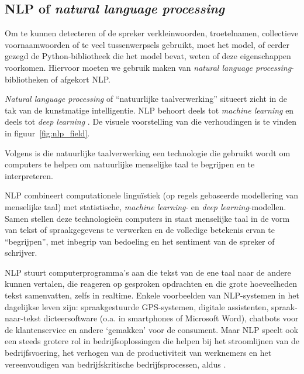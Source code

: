 {\subsection{NLP of \textit{natural language processing}}
Om te kunnen detecteren of de spreker verkleinwoorden, troetelnamen, collectieve voornaamwoorden of te veel tussenwerpsels gebruikt, moet het model, of eerder gezegd de Python-bibliotheek die het model bevat, weten of deze eigenschappen voorkomen. Hiervoor moeten we gebruik maken van \textit{natural language processing}-bibliotheken of afgekort NLP.

\textit{Natural language processing} of ``natuurlijke taalverwerking'' situeert zicht in de tak van de kunstmatige intelligentie. NLP behoort deels tot \textit{machine learning} en deels tot \textit{deep learning} \autocite{Kleinings2022}. De visuele voorstelling van die verhoudingen is te vinden in figuur~\ref{fig:nlp_field}.

Volgens \textcite{Kleinings2022} is die natuurlijke taalverwerking een technologie die gebruikt wordt om computers te helpen om natuurlijke menselijke taal te begrijpen en te interpreteren.

NLP combineert computationele linguïstiek (op regels gebaseerde modellering van menselijke taal) met statistische, \textit{machine learning}- en \textit{deep learning}-modellen. Samen stellen deze technologieën computers in staat menselijke taal in de vorm van tekst of spraakgegevens te verwerken en de volledige betekenis ervan te ``begrijpen'', met inbegrip van bedoeling en het sentiment van de spreker of schrijver.~\autocite{IBMCloudEducation2021}

NLP stuurt computerprogramma's aan die tekst van de ene taal naar de andere kunnen vertalen, die reageren op gesproken opdrachten en die grote hoeveelheden tekst samenvatten, zelfs in realtime. Enkele voorbeelden van NLP-systemen in het dagelijkse leven zijn: spraakgestuurde GPS-systemen, digitale assistenten, spraak-naar-tekst dicteersoftware (o.a. in smartphones of Microsoft Word), chatbots voor de klantenservice en andere `gemakken' voor de consument. Maar NLP speelt ook een steeds grotere rol in bedrijfsoplossingen die helpen bij het stroomlijnen van de bedrijfsvoering, het verhogen van de productiviteit van werknemers en het vereenvoudigen van bedrijfskritische bedrijfsprocessen, aldus \textcite{IBMCloudEducation2021}.

}
